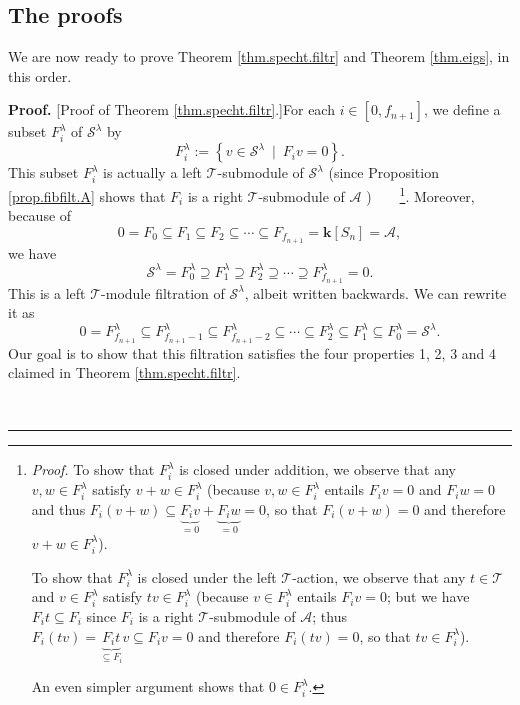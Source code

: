 \documentclass[numbers=enddot,12pt,final,onecolumn,notitlepage]{scrartcl}%
\theoremstyle{definition}
\newenvironment{proof}[1][Proof]{\noindent\textbf{#1.} }{\ \rule{0.5em}{0.5em}}
\begin{document}
\subsection{The proofs}

We are now ready to prove Theorem \ref{thm.specht.filtr} and Theorem
\ref{thm.eigs}, in this order.

\begin{proof}
[Proof of Theorem \ref{thm.specht.filtr}.]For each $i\in\left[  0,f_{n+1}%
\right]  $, we define a subset $F_{i}^{\lambda}$ of $\mathcal{S}^{\lambda}$ by%
\[
F_{i}^{\lambda}:=\left\{  v\in\mathcal{S}^{\lambda}\ \mid\ F_{i}v=0\right\}
.
\]
This subset $F_{i}^{\lambda}$ is actually a left $\mathcal{T}$-submodule of
$\mathcal{S}^{\lambda}$ (since Proposition \ref{prop.fibfilt.A} shows that
$F_{i}$ is a right $\mathcal{T}$-submodule of $\mathcal{A}$%
)\ \ \ \ \footnote{\textit{Proof.} To show that $F_{i}^{\lambda}$ is closed
under addition, we observe that any $v,w\in F_{i}^{\lambda}$ satisfy $v+w\in
F_{i}^{\lambda}$ (because $v,w\in F_{i}^{\lambda}$ entails $F_{i}v=0$ and
$F_{i}w=0$ and thus $F_{i}\left(  v+w\right)  \subseteq\underbrace{F_{i}%
v}_{=0}+\underbrace{F_{i}w}_{=0}=0$, so that $F_{i}\left(  v+w\right)  =0$ and
therefore $v+w\in F_{i}^{\lambda}$).
\par
To show that $F_{i}^{\lambda}$ is closed under the left $\mathcal{T}$-action,
we observe that any $t\in\mathcal{T}$ and $v\in F_{i}^{\lambda}$ satisfy
$tv\in F_{i}^{\lambda}$ (because $v\in F_{i}^{\lambda}$ entails $F_{i}v=0$;
but we have $F_{i}t\subseteq F_{i}$ since $F_{i}$ is a right $\mathcal{T}%
$-submodule of $\mathcal{A}$; thus $F_{i}\left(  tv\right)  =\underbrace{F_{i}%
t}_{\subseteq F_{i}}v\subseteq F_{i}v=0$ and therefore $F_{i}\left(
tv\right)  =0$, so that $tv\in F_{i}^{\lambda}$).
\par
An even simpler argument shows that $0\in F_{i}^{\lambda}$.}. Moreover,
because of%
\[
0=F_{0}\subseteq F_{1}\subseteq F_{2}\subseteq\cdots\subseteq F_{f_{n+1}%
}=\mathbf{k}\left[  S_{n}\right]  =\mathcal{A},
\]
we have%
\[
\mathcal{S}^{\lambda}=F_{0}^{\lambda}\supseteq F_{1}^{\lambda}\supseteq
F_{2}^{\lambda}\supseteq\cdots\supseteq F_{f_{n+1}}^{\lambda}=0.
\]
This is a left $\mathcal{T}$-module filtration of $\mathcal{S}^{\lambda}$,
albeit written backwards. We can rewrite it as%
\[
0=F_{f_{n+1}}^{\lambda}\subseteq F_{f_{n+1}-1}^{\lambda}\subseteq
F_{f_{n+1}-2}^{\lambda}\subseteq\cdots\subseteq F_{2}^{\lambda}\subseteq
F_{1}^{\lambda}\subseteq F_{0}^{\lambda}=\mathcal{S}^{\lambda}.
\]
Our goal is to show that this filtration satisfies the four properties 1, 2, 3
and 4 claimed in Theorem \ref{thm.specht.filtr}.


\end{proof}
\end{document}
